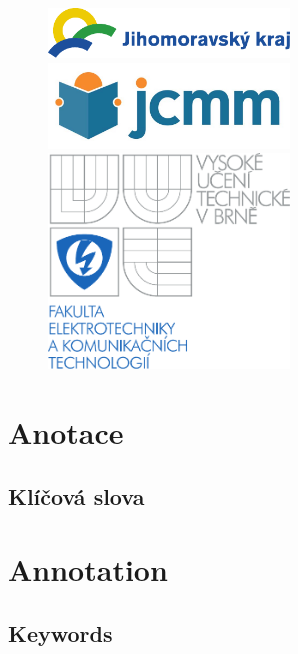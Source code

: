 \documentclass[12pt,a4paper,oneside]{article}
\begin{document}
\vspace{8mm}
\begin{figure}[!htb]
	\includegraphics[width = 64mm]{img/logo-jmk.pdf} \\[8mm]
	\includegraphics[width = 64mm]{img/logo-jcmm.jpg}
\endminipage
{}
	\includegraphics[width = 64mm]{img/logo-vut.pdf}
\endminipage
\end{figure}

\newpage

\section*{Anotace}

\subsection*{Klíčová slova}

\section*{Annotation}

\subsection*{Keywords}

\newpage

\tableofcontents


\newpage
\end{document}
